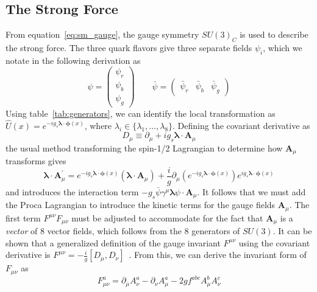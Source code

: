 \subsection{The Strong Force} \label{sec:sm_theory_strong}
From equation~\ref{eq:sm_gauge}, the gauge symmetry $SU(3)_C$ is used to describe the strong force. The three quark flavors give three separate fields $\psi_i$, which we notate in the following derivation as
\begin{equation}
	\psi=\begin{pmatrix}\psi_r\\ \psi_b \\ \psi_g\end{pmatrix} \qquad \bar{\psi}=\begin{pmatrix}\bar{\psi}_r & \bar{\psi}_b & \bar{\psi}_g\end{pmatrix}
\end{equation}
Using table~\ref{tab:generators}, we can identify the local transformation as $\hat{U}(x)=e^{-ig_s\boldsymbol{\lambda}\cdot\boldsymbol{\phi}(x)}$, where $\lambda_i\in\{\lambda_1,...,\lambda_8\}$. Defining the covariant derivative as
\begin{equation}
	D_\mu\equiv\partial_\mu+ig_s\boldsymbol{\lambda}\cdot \mathbf{A}_\mu
\end{equation}
the usual method transforming the spin-1/2 Lagrangian to determine how $\mathbf{A}_\mu$ transforms gives
\begin{equation}
	\boldsymbol{\lambda}\cdot\mathbf{A}^\prime_\mu=e^{-ig_s\boldsymbol{\lambda}\cdot\boldsymbol{\phi}(x)}\left(\boldsymbol{\lambda}\cdot\mathbf{A}_\mu\right)+\frac{i}{g}\partial_\mu\left(e^{-ig_s\boldsymbol{\lambda}\cdot\boldsymbol{\phi}(x)}\right)e^{ig_s\boldsymbol{\lambda}\cdot\boldsymbol{\phi}(x)}
\end{equation}
and introduces the interaction term $-g_s\bar{\psi}\gamma^\mu\boldsymbol{\lambda}\psi\cdot\mathbf{A}_\mu$. It follows that we must add the Proca Lagrangian to introduce the kinetic terms for the gauge fields $\mathbf{A}_\mu$. The first term $F^{\mu\nu}F_{\mu\nu}$ must be adjusted to accommodate for the fact that $\mathbf{A}_\mu$ is a \textit{vector} of 8 vector fields, which follows from the 8 generators of $SU(3)$. It can be shown that a generalized definition of the gauge invariant $F^{\mu\nu}$ using the covariant derivative is $F^{\mu\nu}=-\frac{i}{g}[D_\mu,D_\nu]$~\cite{flournoy}. From this, we can derive the invariant form of $F_{\mu\nu}$ as
\begin{equation}
	\label{eq:qcd_fmunu}
	F_{\mu\nu}^a=\partial_\mu A^a_\nu-\partial_\nu A^a_\mu-2gf^{abc}A^b_\mu A^c_\nu
\end{equation}
